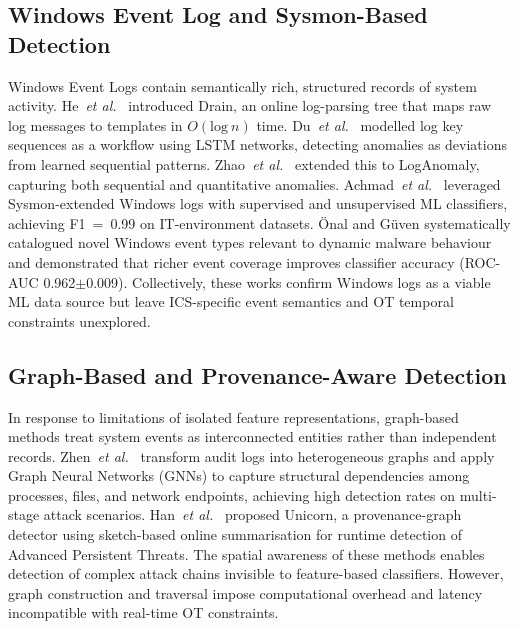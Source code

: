 \label{sec:lit}

\subsection{Windows Event Log and Sysmon-Based Detection}

Windows Event Logs contain semantically rich, structured records of system activity.
He~\textit{et al.}\ \cite{he2017drain} introduced Drain, an online log-parsing tree that
maps raw log messages to templates in $O(\text{log}~n)$ time. Du~\textit{et al.}\
\cite{du2017deeplog} modelled log key sequences as a workflow using LSTM networks, detecting
anomalies as deviations from learned sequential patterns. Zhao~\textit{et al.}\
\cite{zhao2019loganomaly} extended this to LogAnomaly, capturing both sequential and
quantitative anomalies. Achmad~\textit{et al.}\ \cite{achmad2025} leveraged Sysmon-extended
Windows logs with supervised and unsupervised ML classifiers, achieving F1~=~0.99 on
IT-environment datasets. \"{O}nal and G\"{u}ven \cite{onal2025} systematically catalogued
novel Windows event types relevant to dynamic malware behaviour and demonstrated that
richer event coverage improves classifier accuracy (ROC-AUC 0.962$\pm$0.009). Collectively,
these works confirm Windows logs as a viable ML data source but leave ICS-specific event
semantics and OT temporal constraints unexplored.

\subsection{Graph-Based and Provenance-Aware Detection}

In response to limitations of isolated feature representations, graph-based methods
treat system events as interconnected entities rather than independent records. Zhen~\textit{et al.}\
\cite{zhen2025} transform audit logs into heterogeneous graphs and apply Graph Neural
Networks (GNNs) to capture structural dependencies among processes, files, and network
endpoints, achieving high detection rates on multi-stage attack scenarios. Han~\textit{et al.}\
\cite{han2020} proposed Unicorn, a provenance-graph detector using sketch-based online
summarisation for runtime detection of Advanced Persistent Threats. The spatial awareness
of these methods enables detection of complex attack chains invisible to feature-based
classifiers. However, graph construction and traversal impose computational overhead and
latency incompatible with real-time OT constraints.

